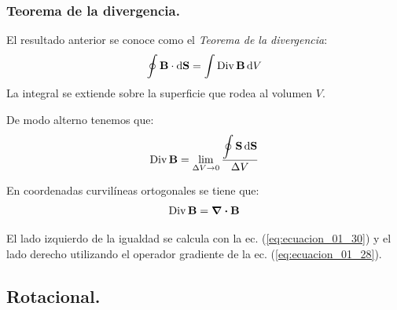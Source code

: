 \documentclass[12pt]{article}
\numberwithin{equation}{section}
\begin{document}
\subsubsection{Teorema de la divergencia.}

El resultado anterior se conoce como el \emph{Teorema de la divergencia}:
\begin{align}
\oint \vb{B} \cdot \dd{\vb{S}} = \int {\rm Div} \, \vb{B} \dd{V}
\label{eq:ecuacion_01_31}
\end{align}
La integral se extiende sobre la superficie que rodea al volumen $V$.
\par
De modo alterno tenemos que:
\begin{align*}
{\rm Div} \, \vb{B} = \lim_{\Delta V \to 0} \dfrac{\displaystyle \oint \vb{S} \dd{\vb{S}}}{\Delta V}
\end{align*}

En coordenadas curvilíneas ortogonales se tiene que:
\begin{align*}
{\rm Div} \, \vb{B} = \div{\vb{B}}
\end{align*}

El lado izquierdo de la igualdad se calcula con la ec. (\ref{eq:ecuacion_01_30}) y el lado derecho utilizando el operador gradiente de la ec. (\ref{eq:ecuacion_01_28}).
\par

\subsection{Rotacional.}
\end{document}
